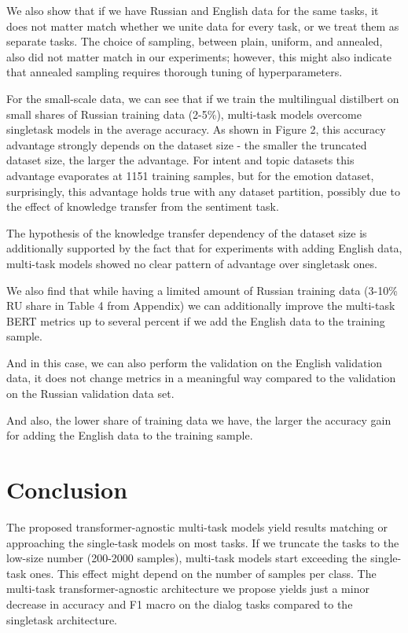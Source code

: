 We also show that if we have Russian and English data for the same tasks, it does not matter match whether we unite data for every task, or we treat them as separate tasks. The choice of sampling, between plain, uniform, and annealed, also did not matter match in our experiments; however, this might also indicate that annealed sampling requires thorough tuning of hyperparameters.

For the small-scale data, we can see that if we train the multilingual distilbert on small shares of Russian training data (2-5\%), multi-task models overcome singletask models in the average accuracy. As shown in Figure 2, this accuracy advantage strongly depends on the dataset size - the smaller the truncated dataset size, the larger the advantage. For intent and topic datasets this advantage evaporates at 1151 training samples, but for the emotion dataset, surprisingly, this advantage holds true with any dataset partition, possibly due to the effect of knowledge transfer from the sentiment task.

The hypothesis of the knowledge transfer dependency of the dataset size is additionally supported by the fact that for experiments with adding English data, multi-task models showed no clear pattern of advantage over singletask ones.

We also find that while having a limited amount of Russian training data (3-10\% RU share in Table 4 from Appendix)  we can additionally improve the multi-task BERT metrics up to several percent if we add the English data to the training sample. 

And in this case, we can also perform the validation on the English validation data, it does not change metrics in a meaningful way compared to the validation on the Russian validation data set. 

And also, the lower share of training data we have, the larger the accuracy gain for adding the English data to the training sample.


\section{Conclusion}

The proposed transformer-agnostic multi-task models yield results matching or approaching the single-task models on most tasks. If we truncate the tasks to the low-size number (200-2000 samples), multi-task models start exceeding the single-task ones. This effect might depend on the number of samples per class.
\fi
The multi-task transformer-agnostic architecture we propose yields just a minor decrease in accuracy and F1 macro on the dialog tasks compared to the singletask architecture. 

